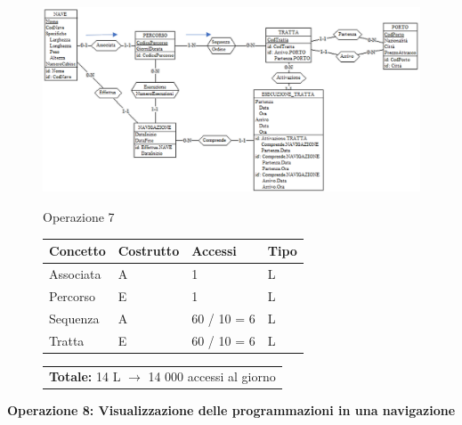 \documentclass[a4paper, titlepage]{report}
\begin{document}
	  \vspace{0.5cm}
	\begin{figure}[h]
		\centering
		\includegraphics[scale=0.7]{images/SchNav02.png}		
	\end{figure}
	\vspace{0.5cm}
	\begin{figure}[h]
		\centering
		Operazione 7\\
		\begin{tabular}{L{3cm}C{2.5cm}C{4.5cm}C{2.5cm}}
			\rule[-2mm]{0mm}{0.65cm}{}
			\textbf{Concetto} & \textbf{Costrutto} &\textbf{Accessi} & \textbf{Tipo} \\
			\hline\rule[-2mm]{0mm}{0.65cm}{}
			Associata & A & 1 & L \\
			\hline\rule[-2mm]{0mm}{0.65cm}{}
			Percorso & E & 1 & L \\
			\hline\rule[-2mm]{0mm}{0.65cm}{}
			Sequenza & A & 60 / 10 = 6 & L \\
			\hline\rule[-2mm]{0mm}{0.65cm}{}
			Tratta & E & 60 / 10 = 6 & L \\
		\end{tabular}
		\begin{tabular}{C{13.9cm}}
			\rule[-4mm]{0mm}{1cm}{}	
			 \textbf{Totale:} 14 L $\to$ 14 000 accessi al giorno
		\end{tabular}
	\end{figure}
	
	\vspace{2cm}
	
\noindent
\textbf{{\large {Operazione 8: }}}\textbf{Visualizzazione delle programmazioni in una navigazione}

	
	
\end{document}
